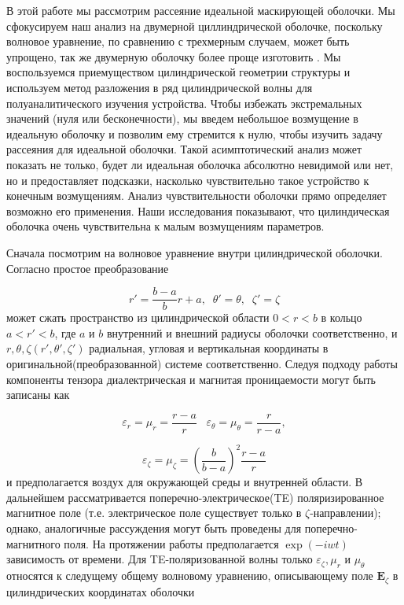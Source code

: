 \documentclass[a4paper, 12pt]{article}
\begin{document}
В этой работе мы рассмотрим рассеяние идеальной маскирующей оболочки.
Мы сфокусируем наш анализ на двумерной циллиндрической
оболочке, поскольку волновое уравнение, по сравнению с трехмерным случаем, может быть упрощено, так же двумерную оболочку
более проще изготовить \cite{7}. Мы воспользуемся приемуществом цилиндрической геометрии структуры и используем
метод разложения в ряд цилиндрической волны для полуаналитического изучения устройства. Чтобы избежать экстремальных значений
(нуля или бесконечности), мы введем небольшое возмущение в идеальную оболочку и позволим ему стремится к нулю, чтобы
изучить задачу рассеяния для идеальной оболочки. Такой асимптотический анализ может показать не только, будет ли 
идеальная оболочка абсолютно невидимой или нет, но и предоставляет подсказки, насколько чувствительно такое устройство к конечным 
возмущениям. Анализ чувствительности оболочки прямо определяет возможно его применения. Наши исследования 
показывают, что цилиндическая оболочка очень чувствительна к малым возмущениям параметров.

Сначала посмотрим на волновое уравнение внутри цилиндрической оболочки. Согласно \cite{1} простое преобразование

\begin{equation}\label{e1}
	r' = \frac{b-a}{b}r+a, \;\; \theta' = \theta, \;\; \zeta' = \zeta
\end{equation}
может сжать пространство из цилиндрической области $0 < r < b$ в кольцо $a < r' < b$, где $a$ и $b$ внутренний и
внешний радиусы оболочки соответственно, и $r, \theta, \zeta (r', \theta', \zeta')$ радиальная, угловая и вертикальная
координаты в оригинальной(преобразованной) системе соответственно. Следуя подходу работы \cite{1} компоненты тензора 
диалектрическая и магнитая проницаемости могут быть записаны как 

\begin{equation*}
	\varepsilon_r = \mu_r = \frac{r-a}{r} \;\;\; \varepsilon_\theta = \mu_\theta = \frac{r}{r-a},	
\end{equation*}  

\begin{equation}\label{e2}
	\varepsilon_\zeta = \mu_\zeta = (\frac{b}{b-a})^2 \frac{r-a}{r}
\end{equation}
и предполагается воздух для окружающей среды и внутренней области. В дальнейшем рассматривается 
поперечно-электрическое(TE) поляризированное магнитное поле (т.е. электрическое поле существует только в 
$\zeta$-направлении); однако, аналогичные рассуждения могут быть проведены для поперечно-магнитного поля. На протяжении
работы предполагается $\exp(-iwt)$ зависимость от времени. Для TE-поляризованной волны только $\varepsilon_\zeta, \mu_r$
и $\mu_\theta$ относятся к следущему общему волновому уравнению, описывающему поле $\textbf{E}_\zeta$ в цилиндрических 
координатах оболочки
\end{document}
